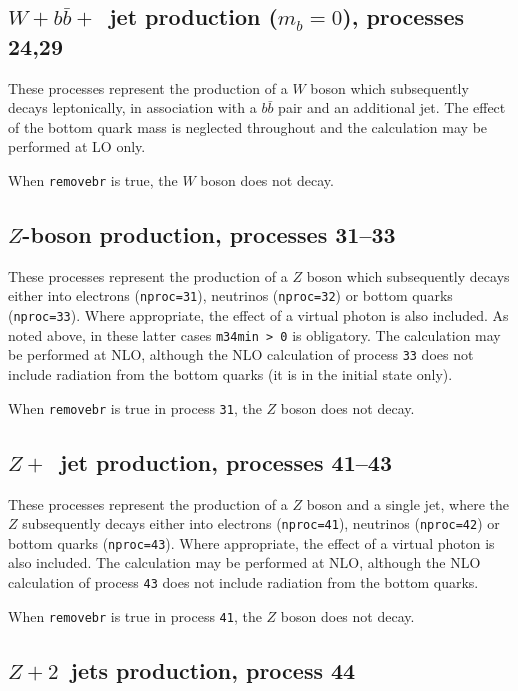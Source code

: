 \documentclass[12pt]{article}
\begin{document}
\subsection{$W+b{\bar b}+$~jet production ($m_b=0$), processes 24,29}
\label{subsec:wbbjetmassless}

These processes represent the production of a $W$ boson which subsequently
decays leptonically, in association with a $b{\bar b}$ pair and an
additional jet. The effect of the bottom quark mass is neglected throughout
and the calculation may be performed at LO only.

When {\tt removebr} is true, the $W$ boson does not decay.

\subsection{$Z$-boson production, processes 31--33}
\label{subsec:zboson}

These processes represent the production of a $Z$ boson which subsequently
decays either into electrons ({\tt nproc=31}), neutrinos ({\tt nproc=32})
or bottom quarks ({\tt nproc=33}). Where appropriate, the effect of a virtual
photon is also included. As noted above, in these latter cases {\tt m34min > 0}
is obligatory. The calculation may be performed at NLO,
although the NLO calculation of process {\tt 33} does not include radiation
from the bottom quarks (it is in the initial state only).

When {\tt removebr} is true in process {\tt 31}, the $Z$ boson does not decay.

\subsection{$Z+$~jet production, processes 41--43}
\label{subsec:zjet}

These processes represent the production of a $Z$ boson and a single jet,
where the $Z$ subsequently
decays either into electrons ({\tt nproc=41}), neutrinos ({\tt nproc=42})
or bottom quarks ({\tt nproc=43}). Where appropriate, the effect of a virtual
photon is also included. The calculation may be performed at NLO,
although the NLO calculation of process {\tt 43} does not include radiation
from the bottom quarks.

When {\tt removebr} is true in process {\tt 41}, the $Z$ boson does not decay.

\subsection{$Z+2$~jets production, process 44}
\label{subsec:z2jets}
\end{document}
